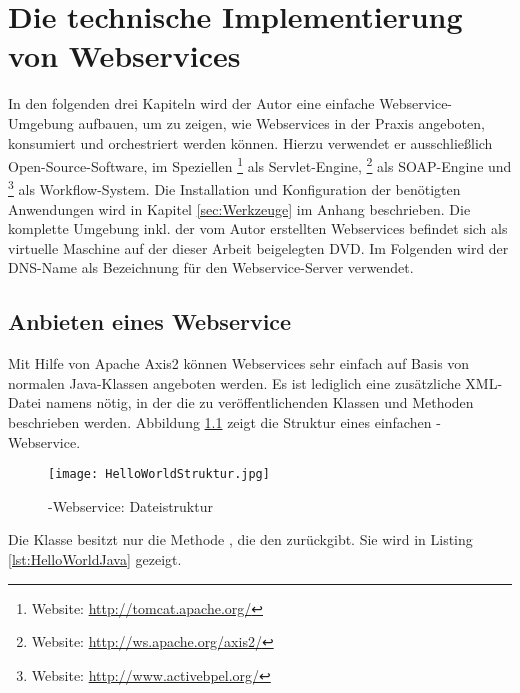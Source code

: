 \chapter{Die technische Implementierung von Webservices}
\label{cha:TechnischeImplementierungWebservices}
In den folgenden drei Kapiteln wird der Autor eine einfache Webservice-Umgebung aufbauen, um zu zeigen, wie Webservices in der Praxis angeboten, konsumiert und orchestriert werden können. Hierzu verwendet er ausschließlich Open-Source-Software, im Speziellen \footnote{Website: \url{http://tomcat.apache.org/}} als Servlet-Engine, \footnote{Website: \url{http://ws.apache.org/axis2/}} als SOAP-Engine und \footnote{Website: \url{http://www.activebpel.org/}} als Workflow-System. Die Installation und Konfiguration der benötigten Anwendungen wird in Kapitel \ref{sec:Werkzeuge} im Anhang beschrieben. Die komplette Umgebung inkl. der vom Autor erstellten Webservices befindet sich als virtuelle Maschine auf der dieser Arbeit beigelegten DVD. Im Folgenden wird der DNS-Name  als Bezeichnung für den Webservice-Server verwendet.

\section{Anbieten eines Webservice}
\label{sec:AnbietenEinesWebservices}
Mit Hilfe von Apache Axis2 können Webservices sehr einfach auf Basis von normalen Java-Klassen angeboten werden. Es ist lediglich eine zusätzliche XML-Datei namens  nötig, in der die zu veröffentlichenden Klassen und Methoden beschrieben werden. Abbildung \ref{fig:HelloWorldStruktur} zeigt die Struktur eines einfachen -Webservice.

\begin{figure}[htb]
\centering
\texttt{[image: HelloWorldStruktur.jpg]}
\caption{-Webservice: Dateistruktur}
\label{fig:HelloWorldStruktur}
\end{figure}

Die Klasse  besitzt nur die Methode , die den   zurückgibt. Sie wird in Listing \ref{lst:HelloWorldJava} gezeigt. 

\lstset{language=Java, basicstyle=\footnotesize, showstringspaces=false, tabsize=2}

